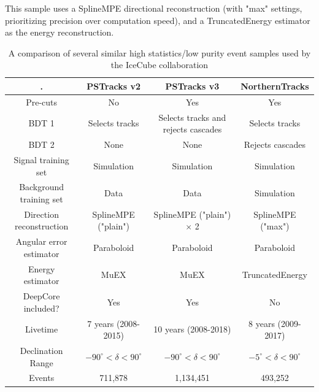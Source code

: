 This sample uses a SplineMPE directional reconstruction (with "max" settings, prioritizing precision over computation speed), and a TruncatedEnergy estimator as the energy reconstruction. 


\begin{table}
\centering
\begin{tabular*}{0.853\textwidth}{|c|ccc|} 
\hline
. & PSTracks v2 & PSTracks v3 & NorthernTracks\\
\hline\hline
Pre-cuts & No & Yes & Yes\\ 
BDT 1 & Selects tracks & Selects tracks and rejects cascades & Selects tracks \\
BDT 2 & None & None & Rejects cascades \\
Signal training set & Simulation & Simulation & Simulation \\
Background training set & Data & Data & Simulation \\
Direction reconstruction & SplineMPE ("plain") & SplineMPE ("plain")$\times$ 2 & SplineMPE ("max") \\
Angular error estimator & Paraboloid & Paraboloid & Paraboloid \\
Energy estimator & MuEX & MuEX & TruncatedEnergy \\ 
DeepCore included? & Yes & Yes & No \\
Livetime & 7 years (2008-2015) & 10 years (2008-2018) & 8 years (2009-2017) \\
Declination Range & $-90^{\circ}<\delta<90^{\circ}$ & $-90^{\circ}<\delta<90^{\circ}$ & $-5^{\circ}<\delta<90^{\circ}$ \\
Events & 711,878 & 1,134,451 & 493,252 \\
\hline
\end{tabular*}
\label{tab:evtsamples}
\caption{A comparison of several similar high statistics/low purity event samples used by the IceCube collaboration}
\end{table}

